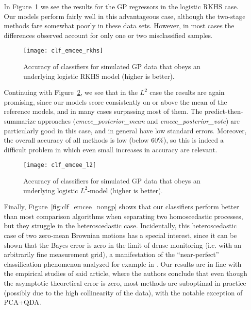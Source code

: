 In Figure~\ref{fig:clf_emcee_rkhs} we see the results for the GP regressors in the logistic RKHS case. Our models perform fairly well in this advantageous case, although the two-stage methods fare somewhat poorly in these data sets. However, in most cases the differences observed account for only one or two misclassified samples.

\begin{figure}[ht!]
  \centering
  \texttt{[image: clf\_emcee\_rkhs]}
  \caption{Accuracy of classifiers for simulated GP data that obeys an underlying logistic RKHS model (higher is better).}\label{fig:clf_emcee_rkhs}
\end{figure}

Continuing with Figure~\ref{fig:clf_emcee_l2}, we see that in the \(L^2\) case the results are again promising, since our models score consistently on or above the mean of the reference models, and in many cases surpassing most of them. The predict-then-summarize approaches (\textit{emcee\_posterior\_mean} and \textit{emcee\_posterior\_vote}) are particularly good in this case, and in general have low standard errors. Moreover, the overall accuracy of all methods is low (below 60\%), so this is indeed a difficult problem in which even small increases in accuracy are relevant.

\begin{figure}[ht!]
  \centering
  \texttt{[image: clf\_emcee\_l2]}
  \caption{Accuracy of classifiers for simulated GP data that obeys an underlying logistic \(L^2\)-model (higher is better).}\label{fig:clf_emcee_l2}
\end{figure}

Finally, Figure~\ref{fig:clf_emcee_nongp} shows that our classifiers perform better than most comparison algorithms when separating two homoscedastic processes, but they struggle in the heteroscedastic case. Incidentally, this heteroscedastic case of two zero-mean Brownian motions has a special interest, since it can be shown that the Bayes error is zero in the limit of dense monitoring (i.e. with an arbitrarily fine measurement grid), a manifestation of the ``near-perfect'' classification phenomenon analyzed for example in \citet{torrecilla2020optimal}. Our results are in line with the empirical studies of said article, where the authors conclude that even though the asymptotic theoretical error is zero, most methods are suboptimal in practice (possibly due to the high collinearity of the data), with the notable exception of PCA+QDA.

